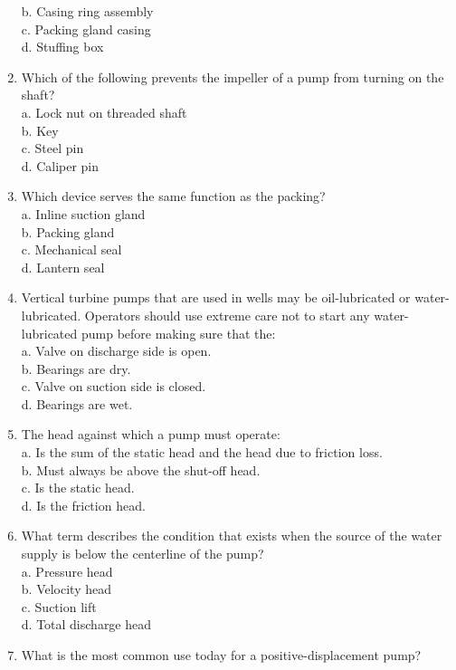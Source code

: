 \begin{enumerate}[1.]
b. Casing ring assembly\\
c. Packing gland casing\\
d. Stuffing box\\
\item Which of the following prevents the impeller of a pump from turning on the shaft?\\
a. Lock nut on threaded shaft\\
b. Key\\
c. Steel pin\\
d. Caliper pin\\
\item Which device serves the same function as the packing?\\
a. Inline suction gland\\
b. Packing gland\\
c. Mechanical seal\\
d. Lantern seal\\
\item Vertical turbine pumps that are used in wells may be oil-lubricated or water-lubricated. Operators should use extreme care not to start any water-lubricated pump before making sure that the:\\
a. Valve on discharge side is open.\\
b. Bearings are dry.\\
c. Valve on suction side is closed.\\
d. Bearings are wet.\\
\item The head against which a pump must operate:\\
a. Is the sum of the static head and the head due to friction loss.\\
b. Must always be above the shut-off head.\\
c. Is the static head.\\
d. Is the friction head.\\
\item What term describes the condition that exists when the source of the water supply is below the centerline of the pump?\\
a. Pressure head\\
b. Velocity head\\
c. Suction lift\\
d. Total discharge head\\
\item What is the most common use today for a positive-displacement pump?\\

\end{enumerate}

